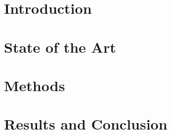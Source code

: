 
\addtolength{\evensidemargin}{-12mm}

%
%
\part[Introduction]{Introduction}
\label{part:introduction}


\part[State of the Art]{State of the Art}
\label{part:stateoftheart}



\part[Methods]{Methods}
\label{part:methods}







\part[Results and Conclusion]{Results and Conclusion}
\label{part:resultsAndConclusion}




%
%


% 
